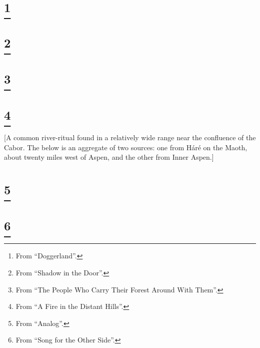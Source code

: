 \documentclass{article}
\let\oldthefootnote\thefootnote
\newcommand\oocfootnote[2][DarkGreen]{\renewcommand\thefootnote{\color{#1}\oldthefootnote}%
  \footnote{\color{#1}#2}%
  \renewcommand{\thefootnote}{\oldthefootnote}}
\begin{document}
\section{\oocfootnote{From ``Doggerland''.}}


\begin{verse}
\end{verse}


\section{\oocfootnote{From ``Shadow in the Door''.}}


\begin{verse}
\end{verse}


\section{\oocfootnote{From ``The People Who Carry Their Forest Around With Them''.}}


\begin{verse}
\end{verse}


\section{\oocfootnote{From ``A Fire in the Distant Hills''.}}

[A common river-ritual found in a relatively wide range near the confluence of the Cabor. The below is an aggregate of two sources: one from Háré on the Maoth, about twenty miles west of Aspen, and the other from Inner Aspen.]

\begin{verse}
\end{verse}


\section{\oocfootnote{From ``Analog''.}}


\begin{verse}
\end{verse}


\section{\oocfootnote{From ``Song for the Other Side''.}}
\end{document}
